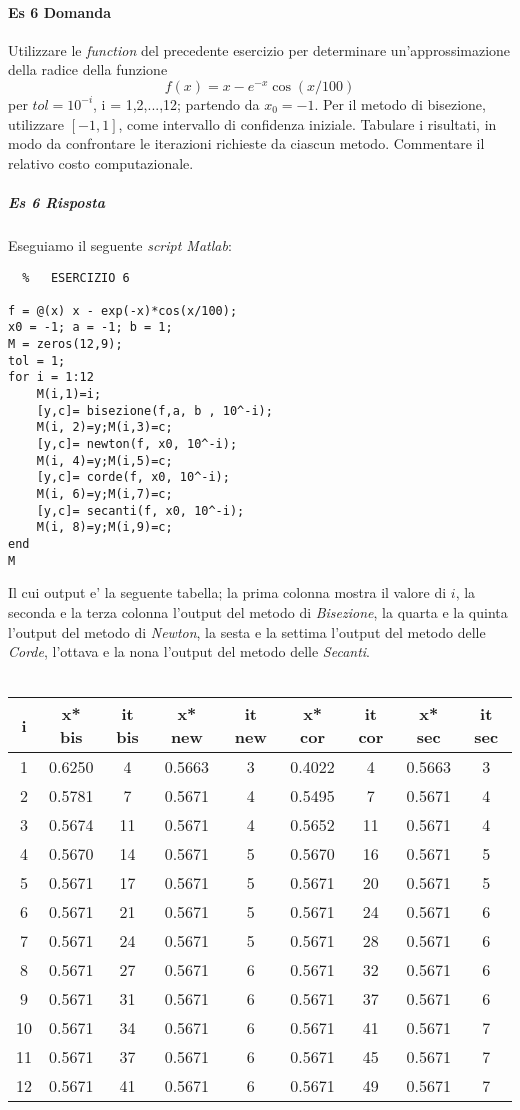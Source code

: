 \documentclass[a4paper]{report}
\begin{document}
\paragraph{Es 6 Domanda}
Utilizzare le \emph{function} del precedente esercizio per determinare un'approssimazione della radice della funzione
\[
f(x) = x-e^{-x} \cos(x/100)
\]
per $tol = 10^{-i}$, i = 1,2,...,12; partendo da $x_0 = -1$. Per il metodo di bisezione, utilizzare $[-1,1]$, come intervallo di confidenza iniziale. Tabulare i risultati, in modo da confrontare le iterazioni richieste da ciascun metodo. Commentare il relativo costo computazionale.
\subparagraph{Es 6 Risposta}
Eseguiamo il seguente \emph{script Matlab}:\\
\begin{lstlisting}	% 	ESERCIZIO 6

f = @(x) x - exp(-x)*cos(x/100);
x0 = -1; a = -1; b = 1;
M = zeros(12,9);
tol = 1;
for i = 1:12
	M(i,1)=i;
	[y,c]= bisezione(f,a, b , 10^-i);
	M(i, 2)=y;M(i,3)=c; 
	[y,c]= newton(f, x0, 10^-i);
	M(i, 4)=y;M(i,5)=c;
	[y,c]= corde(f, x0, 10^-i);
	M(i, 6)=y;M(i,7)=c;
	[y,c]= secanti(f, x0, 10^-i);
	M(i, 8)=y;M(i,9)=c;
end
M
\end{lstlisting}
Il cui output e' la seguente tabella; la prima colonna mostra il valore di $i$, la seconda e la terza colonna l'output del metodo di \emph{Bisezione}, la quarta e la quinta l'output del metodo di \emph{Newton}, la sesta e la settima l'output del metodo delle \emph{Corde}, l'ottava e la nona l'output del metodo delle \emph{Secanti}.\\ \\
\begin{tabular}{|c|c|c|c|c|c|c|c|c|}
	\hline 
	i&x* bis&it bis&x* new&it new&x* cor&it cor&x* sec&it sec\\ 
	\hline 
    1&0.6250&4&0.5663&3&0.4022&4&0.5663&3\\ 
	\hline
	2&0.5781&7&0.5671&4&0.5495&7&0.5671&4\\
	\hline
	3&0.5674&11&0.5671 &4&0.5652&11&0.5671&4\\
	\hline
	4&0.5670&14&0.5671 &5&0.5670&16&0.5671&5\\
	\hline
	5&0.5671&17&0.5671 &5&0.5671&20&0.5671&5\\
	\hline
	6&0.5671&21&0.5671 &5&0.5671&24&0.5671&6\\
	\hline
	7&0.5671&24&0.5671 &5&0.5671&28&0.5671&6\\
	\hline
	8&0.5671&27&0.5671 &6&0.5671&32&0.5671&6\\
	\hline
	9&0.5671&31&0.5671 &6&0.5671&37&0.5671&6\\
	\hline
	10&0.5671&34&0.5671&6&0.5671&41&0.5671&7\\
	\hline
	11&0.5671&37&0.5671&6&0.5671&45&0.5671&7\\
	\hline
	12&0.5671&41&0.5671&6&0.5671&49&0.5671&7\\
	\hline
\end{tabular} 
\end{document}
